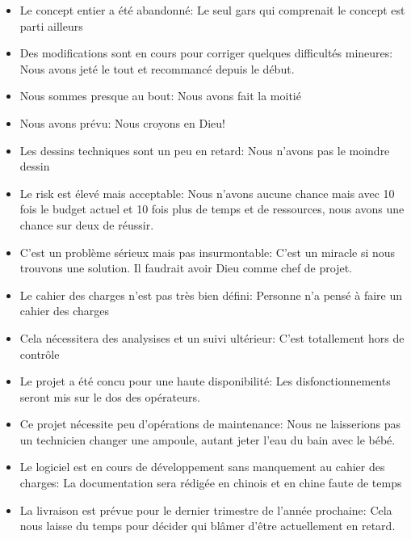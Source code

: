 \begin{itemize}
		\item Le concept entier a été abandonné: Le seul gars qui comprenait le concept est parti ailleurs

		\item Des modifications sont en cours pour corriger quelques difficultés mineures: Nous avons jeté le tout et recommancé depuis le début.
		
		\item Nous sommes presque au bout: Nous avons fait la moitié

		\item Nous avons prévu: Nous croyons en Dieu!

		\item Les dessins techniques sont un peu en retard: Nous n'avons pas le moindre dessin

		\item Le risk est élevé mais acceptable: Nous n'avons aucune chance mais avec 10 fois le budget actuel et 10 fois plus de temps et de ressources, nous avons une chance sur deux de réussir.

		\item C'est un problème sérieux mais pas insurmontable: C'est un miracle si nous trouvons une solution. Il faudrait avoir Dieu comme chef de projet.

		\item Le cahier des charges n'est pas très bien défini: Personne n'a pensé à faire un cahier des charges

		\item Cela nécessitera des analysises et un suivi ultérieur: C'est totallement hors de contrôle

		\item Le projet a été concu pour une haute disponibilité: Les disfonctionnements seront mis sur le dos des opérateurs.

		\item Ce projet nécessite peu d'opérations de maintenance: Nous ne laisserions pas un technicien changer une ampoule, autant jeter l'eau du bain avec le bébé.

		\item Le logiciel est en cours de développement sans manquement au cahier des charges: La documentation sera rédigée en chinois et en chine faute de temps

		\item La livraison est prévue pour le dernier trimestre de l'année prochaine: Cela nous laisse du temps pour décider qui blâmer d'être actuellement en retard.
	\end{itemize}
	
